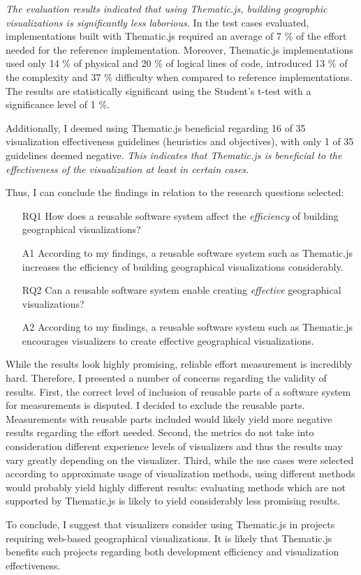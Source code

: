 \emph{The evaluation results indicated that using Thematic.js, building geographic visualizations is significantly less laborious.} In the test cases evaluated, implementations built with Thematic.js required an average of 7 \% of the effort needed for the reference implementation. Moreover, Thematic.js implementations used only 14 \% of physical and 20 \% of logical lines of code, introduced 13 \% of the complexity and 37 \% difficulty when compared to reference implementations. The results are statistically significant using the Student's t-test with a significance level of 1 \%.

Additionally, I deemed using Thematic.js beneficial regarding 16 of 35 visualization effectiveness guidelines (heuristics and objectives), with only 1 of 35 guidelines deemed negative. \emph{This indicates that Thematic.js is beneficial to the effectiveness of the visualization at least in certain cases.}

Thus, I can conclude the findings in relation to the research questions selected:%

\begin{enumerate}
	\item[RQ1] How does a reusable software system affect the \emph{efficiency} of building geographical visualizations?
	\item[A1] According to my findings, a reusable software system such as Thematic.js increases the efficiency of building geographical visualizations considerably.
\end{enumerate}
\begin{enumerate}
	\item[RQ2] Can a reusable software system enable creating \emph{effective} geographical visualizations?
	\item[A2] According to my findings, a reusable software system such as Thematic.js encourages visualizers to create effective geographical visualizations.
\end{enumerate}

While the results look highly promising, reliable effort measurement is incredibly hard. Therefore, I presented a number of concerns regarding the validity of results. First, the correct level of inclusion of reusable parts of a software system for measurements is disputed. I decided to exclude the reusable parts. Measurements with reusable parts included would likely yield more negative results regarding the effort needed. Second, the metrics do not take into consideration different experience levels of visualizers and thus the results may vary greatly depending on the visualizer. Third, while the use cases were selected according to approximate usage of visualization methods, using different methods would probably yield highly different results: evaluating methods which are not supported by Thematic.js is likely to yield considerably less promising results.

To conclude, I suggest that visualizers consider using Thematic.js in projects requiring web-based geographical visualizations. It is likely that Thematic.js benefits such projects regarding both development efficiency and visualization effectiveness.

